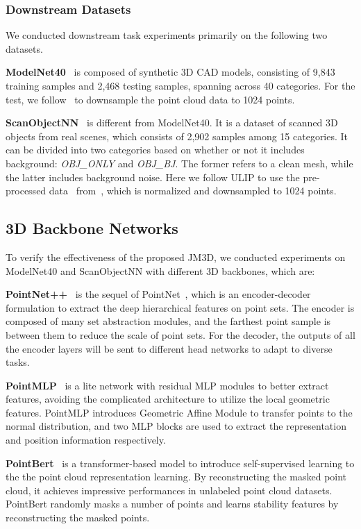 \documentclass[sigconf]{acmart}
\begin{document}
\subsubsection{\textbf{Downstream Datasets}}
We conducted downstream task experiments primarily on the following two datasets.

\textbf{ModelNet40}~\cite{wu20153d} is composed of synthetic 3D CAD models, consisting of 9,843 training samples and 2,468 testing samples, spanning across 40 categories. For the test, we follow~\cite{marethinking} to downsample the point cloud data to 1024 points.

\textbf{ScanObjectNN}~\cite{uy2019revisiting} is different from ModelNet40. It is a dataset of scanned 3D objects from real scenes, which consists of 2,902 samples among 15 categories. It can be divided into two categories based on whether or not it includes background: \emph{OBJ\_ONLY} and \emph{OBJ\_BJ}. The former refers to a clean mesh, while the latter includes background noise. Here we follow ULIP to use the pre-processed data~\cite{uy2019revisiting} from~\cite{yu2022point}, which is normalized and downsampled to 1024 points.

\subsection{3D Backbone Networks}
To verify the effectiveness of the proposed JM3D, we conducted experiments on ModelNet40 and ScanObjectNN with different 3D backbones, which are:

\textbf{PointNet++}~\cite{qi2017pointnet++} is the sequel of PointNet~\cite{qi2017pointnet}, which is an encoder-decoder formulation to extract the deep hierarchical features on point sets. The encoder is composed of many set abstraction modules, and the farthest point sample is between them to reduce the scale of point sets. For the decoder, the outputs of all the encoder layers will be sent to different head networks to adapt to diverse tasks.

\textbf{PointMLP}~\cite{marethinking} is a lite network with residual MLP modules to better extract features, avoiding the complicated architecture to utilize the local geometric features. PointMLP introduces Geometric Affine Module to transfer points to the normal distribution, and two MLP blocks are used to extract the representation and position information respectively. 

\textbf{PointBert}~\cite{yu2022point} is a transformer-based model to introduce self-supervised learning to the the point cloud representation learning. By reconstructing the masked point cloud, it achieves impressive performances in unlabeled point cloud datasets. PointBert randomly masks a number of points and learns stability features by reconstructing the masked points. 
\end{document}
